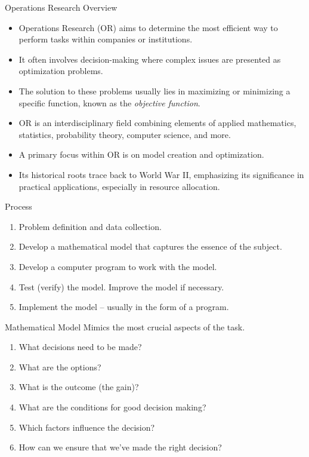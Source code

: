\documentclass[
    NAME={Dr. Helga Ingimundardóttir},
    EMAIL={helgaingim@hi.is},
    FACULTY={Industrial Engineering},
    TITLE={Linear Optimization},
    SUBTITLE={Fundamentals and Applications},
    SEMINAR={VÉL113F},
    DATE={Design and Optimization}
]{HI-latex/hi-beamer}
\begin{document}
    \begin{frame}[allowframebreaks]{Operations Research Overview}
        \begin{itemize}
            \item Operations Research (OR) aims to determine the most efficient way to perform tasks within companies or
            institutions.
            \item It often involves decision-making where complex issues are presented as optimization problems.
            \item The solution to these problems usually lies in maximizing or minimizing a specific function, known as
            the \emph{objective function}.
            \item OR is an interdisciplinary field combining elements of applied mathematics, statistics, probability
            theory, computer science, and more.
            \item A primary focus within OR is on model creation and optimization.
            \item Its historical roots trace back to World War II, emphasizing its significance in practical applications,
            especially in resource allocation.
        \end{itemize}

        \framebreak

        \begin{block}{Process}
            \begin{enumerate}
                \item Problem definition and data collection.
                \item Develop a mathematical model that captures the essence of the subject.
                \item Develop a computer program to work with the model.
                \item Test (verify) the model. Improve the model if necessary.
                \item Implement the model -- usually in the form of a program.
            \end{enumerate}
        \end{block}

        \framebreak

        \begin{block}{Mathematical Model}
            Mimics the most crucial aspects of the task.
            \begin{enumerate}
                \item What decisions need to be made?
                \item What are the options?
                \item What is the outcome (the gain)?
                \item What are the conditions for good decision making?
                \item Which factors influence the decision?
                \item How can we ensure that we've made the right decision?
            \end{enumerate}
        \end{block}


\end{frame}
\end{document}
